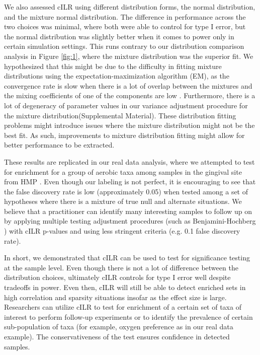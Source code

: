 \documentclass{article}
\begin{document}
We also assessed cILR using different distribution forms, the normal distribution, and the mixture normal distribution. The difference in performance across the two choices was minimal, where both were able to control for type I error, but the normal distribution was slightly better when it comes to power only in certain simulation settings. This runs contrary to our distribution comparison analysis in Figure \ref{fig:1}, where the mixture distribution was the superior fit. We hypothesized that this might be due to the difficulty in fitting mixture distributions using the expectation-maximization algorithm (EM), as the convergence rate is slow when there is a lot of overlap between the mixtures and the mixing coefficients of one of the components are low \cite{naim2012}. Furthermore, there is a lot of degeneracy of parameter values in our variance adjustment procedure for the mixture distribution(Supplemental Material). These distribution fitting problems might introduce issues where the mixture distribution might not be the best fit. As such, improvements to mixture distribution fitting might allow for better performance to be extracted.  

These results are replicated in our real data analysis, where we attempted to test for enrichment for a group of aerobic taxa among samples in the gingival site from HMP \cite{consortium2012}. Even though our labeling is not perfect, it is encouraging to see that the false discovery rate is low (approximately 0.05) when tested among a set of hypotheses where there is a mixture of true null and alternate situations. We believe that a practitioner can identify many interesting samples to follow up on by applying multiple testing adjustment procedures (such as Benjamini-Hochberg \cite{benjamini1995}) with cILR p-values and using less stringent criteria (e.g. 0.1 false discovery rate).  

In short, we demonstrated that cILR can be used to test for significance testing at the sample level. Even though there is not a lot of difference between the distribution choices, ultimately cILR controls for type I error well despite tradeoffs in power. Even then, cILR will still be able to detect enriched sets in high correlation and sparsity situations insofar as the effect size is large. Researchers can utilize cILR to test for enrichment of a certain set of taxa of interest to perform follow-up experiments or to identify the prevalence of certain sub-population of taxa (for example, oxygen preference as in our real data example). The conservativeness of the test ensures confidence in detected samples.  
\end{document}

